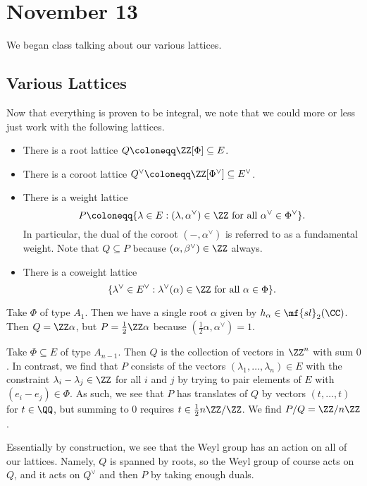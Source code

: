 \documentclass[../notes.tex]{subfiles}
\begin{document}
\section{November 13}
We began class talking about our various lattices.

\subsection{Various Lattices}
Now that everything is proven to be integral, we note that we could more or less just work with the following lattices.
\begin{itemize}
	\item There is a root lattice $Q\coloneqq\ZZ[\Phi]\subseteq E$.
	\item There is a coroot lattice $Q^\lor\coloneqq\ZZ[\Phi^\lor]\subseteq E^\lor$.
	\item There is a weight lattice
	\[P\coloneqq\{\lambda\in E:(\lambda,\alpha^\lor)\in\ZZ\text{ for all }\alpha^\lor\in\Phi^\lor\}.\]
	In particular, the dual of the coroot $(-,\alpha^\lor)$ is referred to as a fundamental weight. Note that $Q\subseteq P$ because $(\alpha,\beta^\lor)\in\ZZ$ always.
	\item There is a coweight lattice
	\[\{\lambda^\lor\in E^\lor:\lambda^\lor(\alpha)\in\ZZ\text{ for all }\alpha\in\Phi\}.\]
\end{itemize}
\begin{example}
	Take $\Phi$ of type $A_1$. Then we have a single root $\alpha$ given by $h_\alpha\in\mf{sl}_2(\CC)$. Then $Q=\ZZ\alpha$, but $P=\frac12\ZZ\alpha$ because $\left(\frac12\alpha,\alpha^\lor\right)=1$.
\end{example}
\begin{example}
	Take $\Phi\subseteq E$ of type $A_{n-1}$. Then $Q$ is the collection of vectors in $\ZZ^n$ with sum $0$. In contrast, we find that $P$ consists of the vectors $(\lambda_1,\ldots,\lambda_n)\in E$ with the constraint $\lambda_i-\lambda_j\in\ZZ$ for all $i$ and $j$ by trying to pair elements of $E$ with $(e_i-e_j)\in\Phi$. As such, we see that $P$ has translates of $Q$ by vectors $(t,\ldots,t)$ for $t\in\QQ$, but summing to $0$ requires $t\in\frac12n\ZZ/\ZZ$. We find $P/Q=\ZZ/n\ZZ$.
\end{example}
\begin{remark}
	Essentially by construction, we see that the Weyl group has an action on all of our lattices. Namely, $Q$ is spanned by roots, so the Weyl group of course acts on $Q$, and it acts on $Q^\lor$ and then $P$ by taking enough duals.
\end{remark}
\end{document}
